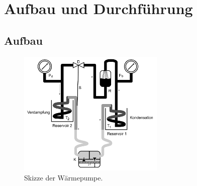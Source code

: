 \section{Aufbau und Durchführung}
\label{sec:Durchführung}
\subsection{Aufbau}

\begin{figure}[H]
  \centering
  \includegraphics[height=6cm]{skizze.png}
  \caption{Skizze der Wärmepumpe.}
  \label{fig:skizze}
\end{figure}

